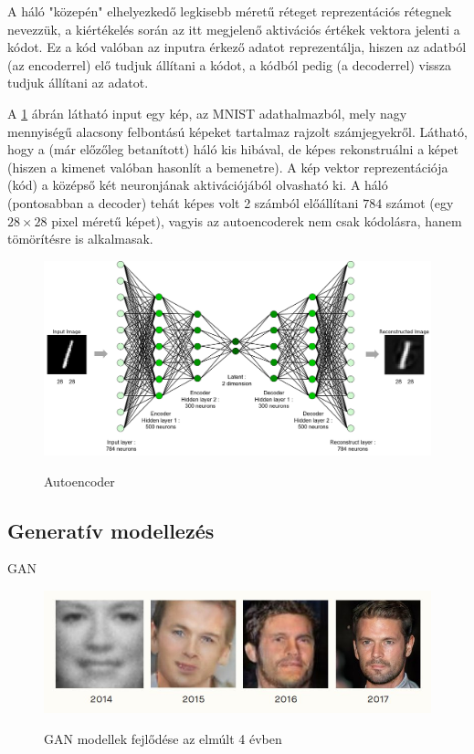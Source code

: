 \documentclass[12pt]{article}
\begin{document}
A háló "közepén" elhelyezkedő legkisebb méretű réteget reprezentációs rétegnek nevezzük, a kiértékelés során az itt megjelenő aktivációs értékek vektora jelenti a kódot. Ez a kód valóban az inputra érkező adatot reprezentálja, hiszen az adatból (az encoderrel) elő tudjuk állítani a kódot, a kódból pedig (a decoderrel) vissza tudjuk állítani az adatot.

A \ref{AE_arch2} ábrán látható input egy kép, az MNIST adathalmazból, mely nagy mennyiségű alacsony felbontású képeket tartalmaz rajzolt számjegyekről. Látható, hogy a (már előzőleg betanított) háló kis hibával, de képes rekonstruálni a képet (hiszen a kimenet valóban hasonlít a bemenetre). A kép vektor reprezentációja (kód) a középső két neuronjának aktivációjából olvasható ki. A háló (pontosabban a decoder) tehát képes volt 2 számból előállítani $784$ számot (egy $28\times 28$ pixel méretű képet), vagyis az autoencoderek nem csak kódolásra, hanem tömörítésre is alkalmasak.


\begin{figure}[h!]
\begin{center}
  \label{AE_arch2}
  \includegraphics[width=\linewidth]{AE_arch2.png}
  \caption{Autoencoder}
\end{center}
\end{figure}


\subsection{Generatív modellezés}

GAN

\begin{figure}[h!]
\begin{center}
  \label{gan_progress}
  \includegraphics[width=\linewidth]{gan_progress.jpg}
  \caption{GAN modellek fejlődése az elmúlt 4 évben}
\end{center}
\end{figure}
\end{document}
